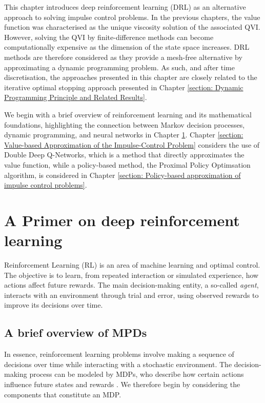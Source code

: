 \label{section: Deep Reinforcement Learning for Impulse Control Problems}
This chapter introduces deep reinforcement learning (DRL) as an alternative approach to solving impulse control problems. In the previous chapters, the value function was characterised as the unique viscosity solution of the associated QVI. However, solving the QVI by finite-difference methods can become computationally expensive as the dimension of the state space increases. DRL methods are therefore considered as they provide a mesh-free alternative by approximating a dynamic programming problem. As such, and after time discretisation, the approaches presented in this chapter are closely related to the iterative optimal stopping approach presented in Chapter \ref{section: Dynamic Programming Principle and Related Results}. 

We begin with a brief overview of reinforcement learning and its mathematical foundations, highlighting the connection between Markov decision processes, dynamic programming, and neural networks in Chapter \ref{section: A Primer on Deep Reinforcement Learning}. Chapter \ref{section: Value-based Approximation of the Impulse-Control Problem} considers the use of Double Deep Q-Networks, which is a method that directly approximates the value function, while a policy-based method, the Proximal Policy Optimsation algorithm, is considered in Chapter \ref{section: Policy-based approximation of impulse control problems}. 

\section{A Primer on deep reinforcement learning}
\label{section: A Primer on Deep Reinforcement Learning}
Reinforcement Learning (RL) is an area of machine learning and optimal control. The objective is to learn, from repeated interaction or simulated experience, how actions affect future rewards. The main decision-making entity, a so-called \emph{agent}, interacts with an environment through trial and error, using observed rewards to improve its decisions over time.

\subsection{A brief overview of MPDs}
In essence, reinforcement learning problems involve making a sequence of decisions over time while interacting with a stochastic environment. The decision-making process can be modeled by MDPs, who describe how certain actions influence future states and rewards \cite{bellman1957dynamic}. We therefore begin by considering the components that constitute an MDP. 

